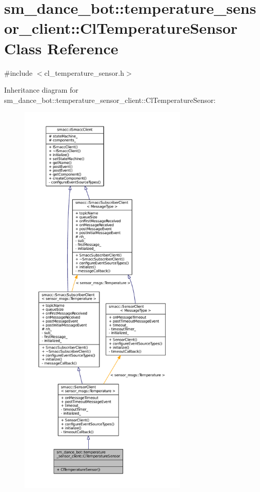 \hypertarget{classsm__dance__bot_1_1temperature__sensor__client_1_1ClTemperatureSensor}{}\section{sm\+\_\+dance\+\_\+bot\+:\+:temperature\+\_\+sensor\+\_\+client\+:\+:Cl\+Temperature\+Sensor Class Reference}
\label{classsm__dance__bot_1_1temperature__sensor__client_1_1ClTemperatureSensor}


{\ttfamily \#include $<$cl\+\_\+temperature\+\_\+sensor.\+h$>$}



Inheritance diagram for sm\+\_\+dance\+\_\+bot\+:\+:temperature\+\_\+sensor\+\_\+client\+:\+:Cl\+Temperature\+Sensor\+:
\nopagebreak
\begin{figure}[H]
\begin{center}
\leavevmode
\includegraphics[height=550pt]{classsm__dance__bot_1_1temperature__sensor__client_1_1ClTemperatureSensor__inherit__graph}
\end{center}
\end{figure}


